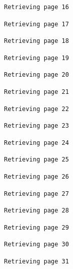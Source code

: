 \documentclass[
  letterpaper,
  DIV=11,
  numbers=noendperiod]{scrartcl}
\begin{document}
\begin{verbatim}
Retrieving page 16
\end{verbatim}

\begin{verbatim}
Retrieving page 17
\end{verbatim}

\begin{verbatim}
Retrieving page 18
\end{verbatim}

\begin{verbatim}
Retrieving page 19
\end{verbatim}

\begin{verbatim}
Retrieving page 20
\end{verbatim}

\begin{verbatim}
Retrieving page 21
\end{verbatim}

\begin{verbatim}
Retrieving page 22
\end{verbatim}

\begin{verbatim}
Retrieving page 23
\end{verbatim}

\begin{verbatim}
Retrieving page 24
\end{verbatim}

\begin{verbatim}
Retrieving page 25
\end{verbatim}

\begin{verbatim}
Retrieving page 26
\end{verbatim}

\begin{verbatim}
Retrieving page 27
\end{verbatim}

\begin{verbatim}
Retrieving page 28
\end{verbatim}

\begin{verbatim}
Retrieving page 29
\end{verbatim}

\begin{verbatim}
Retrieving page 30
\end{verbatim}

\begin{verbatim}
Retrieving page 31
\end{verbatim}
\end{document}
